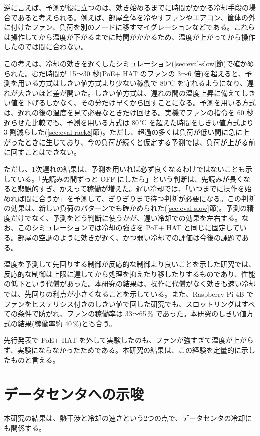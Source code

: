 逆に言えば、予測が役に立つのは、効き始めるまでに時間がかかる冷却手段の場合であると考えられる。例えば、部屋全体を冷やすファンやエアコン、筐体の外に付けたファン、負荷を別のノードに移すマイグレーションなどである。これらは操作してから温度が下がるまでに時間がかかるため、温度が上がってから操作したのでは間に合わない。

この考えは、冷却の効きを遅くしたシミュレーション(\ref{sec:eval-slow}節)で確かめられた。むだ時間が 15〜30 秒(PoE+ HAT のファンの 3〜6 倍)を超えると、予測を用いる方式はしきい値方式より少ない稼働で 80\,℃ を守れるようになり、遅れが大きいほど差が開いた。しきい値方式は、遅れの間の温度上昇に備えてしきい値を下げるしかなく、その分だけ早くから回すことになる。予測を用いる方式は、遅れの後の温度を見て必要なときだけ回せる。実機でファンの指令を 60 秒遅らせた比較でも、予測を用いる方式は 80\,℃ を超えた時間をしきい値方式より 3 割減らした(\ref{sec:eval-rack8}節)。ただし、超過の多くは負荷が低い間に急に上がったときに生じており、今の負荷が続くと仮定する予測では、負荷が上がる前に回すことはできない。

ただし、1次遅れの結果は、予測を用いれば必ず良くなるわけではないことも示している。「先読みの間ずっと OFF にしたら」という判断は、先読みが長くなると悲観的すぎ、かえって稼働が増えた。遅い冷却では、「いつまでに操作を始めれば間に合うか」を予測して、ぎりぎりまで待つ判断が必要になる。この判断の効果は、新しい負荷のパターンでも確かめられた(\ref{sec:eval-slow}節)。予測の精度だけでなく、予測をどう判断に使うかが、遅い冷却での効果を左右する。なお、このシミュレーションでは冷却の強さを PoE+ HAT と同じに固定している。部屋の空調のように効きが遅く、かつ弱い冷却での評価は今後の課題である。

温度を予測して先回りする制御が反応的な制御より良いことを示した研究\cite{coskun2008proactive,yeo2008pdtm}では、反応的な制御は上限に達してから処理を抑えたり移したりするものであり、性能の低下という代償があった。本研究の結果は、操作に代償がなく効きも速い冷却では、先回りの利点が小さくなることを示している。また、Raspberry Pi 4B でファンをヒステリシス付きのしきい値で回した研究\cite{benoitcattin2020throttling}でも、スロットリングはすべての条件で防がれ、ファンの稼働率は 33〜65\,\% であった。本研究のしきい値方式の結果(稼働率約 40\,\%)とも合う。

先行発表で PoE+ HAT を外して実験したのも、ファンが強すぎて温度が上がらず、実験にならなかったためである。本研究の結果は、この経験を定量的に示したものと言える。

\section{データセンタへの示唆}\label{sec:disc-dc}
本研究の結果は、熱干渉と冷却の速さという2つの点で、データセンタの冷却にも関係する。

